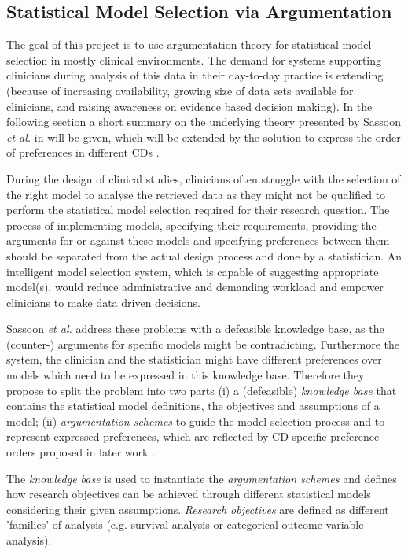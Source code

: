 \subsection{Statistical Model Selection via Argumentation}

\label{sub:statistical_model_selection}

The goal of this project is to use argumentation theory for statistical model selection in mostly clinical environments. The demand for systems supporting clinicians during analysis of this data in their day-to-day practice is extending (because of increasing availability, growing size of data sets available for clinicians, and raising awareness on evidence based decision making). In the following section a short summary on the underlying theory presented by Sassoon \textit{et al.} in \cite{sassoon2014} will be given, which will be extended by the solution to express the order of preferences in different \glspl{CD} \cite{sassoon2016,sassoon2016CD}.

During the design of clinical studies, clinicians often struggle with the selection of the right model to analyse the retrieved data as they might not be qualified to perform the statistical model selection required for their research question. The process of implementing models, specifying their requirements, providing the arguments for or against these models and specifying preferences between them should be separated from the actual design process and  done by a statistician. An intelligent model selection system, which is capable of suggesting appropriate model(s), would reduce administrative and demanding workload and empower clinicians to make data driven decisions.

Sassoon \textit{et al.} \cite{sassoon2014} address these problems with a defeasible knowledge base, as the (counter-) arguments for specific models might be contradicting. Furthermore the system, the clinician and the statistician might have different preferences over models which need to be expressed in this  knowledge base. Therefore they propose to split the problem into two parts (i) a (defeasible) \textit{knowledge base} that contains the statistical model definitions, the objectives and assumptions of a model; (ii) \textit{argumentation schemes} to guide the model selection process and to represent expressed preferences, which are reflected by \gls{CD} specific preference orders proposed in later work \cite{sassoon2016,sassoon2016CD} .

The \textit{knowledge base} is used to instantiate the \textit{argumentation schemes} and defines how research objectives can be achieved through different statistical models considering their given assumptions. \textit{Research objectives} are defined as different 'families' of analysis (e.g. survival analysis or categorical outcome variable analysis).


